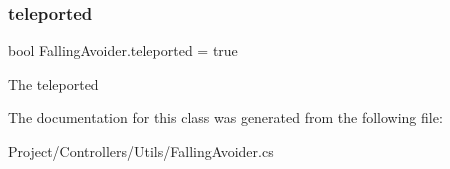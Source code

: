 \subsubsection{\texorpdfstring{teleported}{teleported}}
{\footnotesize\ttfamily bool Falling\+Avoider.\+teleported = true}



The teleported 



The documentation for this class was generated from the following file\+:\begin{DoxyCompactItemize}
\item 
Project/\+Controllers/\+Utils/Falling\+Avoider.\+cs\end{DoxyCompactItemize}

